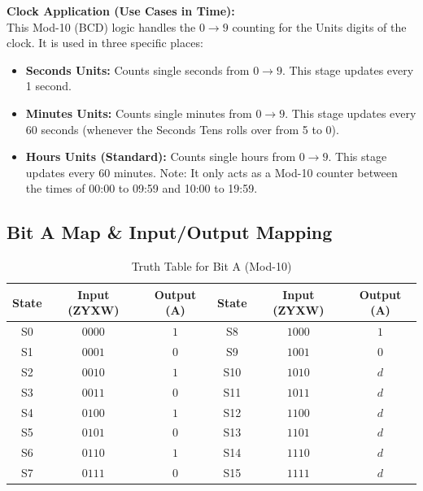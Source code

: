 \documentclass[journal,12pt,onecolumn]{IEEEtran}
\begin{document}
		\begin{justify}
			\textbf{Clock Application (Use Cases in Time):} \\
			This Mod-10 (BCD) logic handles the $0 \rightarrow 9$ counting for the Units digits of the clock. It is used in three specific places:
			\begin{itemize}
				\item \textbf{Seconds Units:} Counts single seconds from $0 \rightarrow 9$. This stage updates every 1 second.
				\item \textbf{Minutes Units:} Counts single minutes from $0 \rightarrow 9$. This stage updates every 60 seconds (whenever the Seconds Tens rolls over from 5 to 0).
				\item \textbf{Hours Units (Standard):} Counts single hours from $0 \rightarrow 9$. This stage updates every 60 minutes. Note: It only acts as a Mod-10 counter between the times of 00:00 to 09:59 and 10:00 to 19:59.
			\end{itemize}
		\end{justify}
		
		\vspace{1em}
		\subsection{Bit A Map \& Input/Output Mapping}
		
		\begin{table}[H]
			\centering
			\begin{tabular}{|c|c|c||c|c|c|}
				\hline
				\textbf{State} & \textbf{Input (ZYXW)} & \textbf{Output (A)} & \textbf{State} & \textbf{Input (ZYXW)} & \textbf{Output (A)} \\
				\hline
				S0 & $0000$ & $1$ & S8 & $1000$ & $1$ \\
				\hline
				S1 & $0001$ & $0$ & S9 & $1001$ & $0$ \\
				\hline
				S2 & $0010$ & $1$ & S10 & $1010$ & $d$ \\
				\hline
				S3 & $0011$ & $0$ & S11 & $1011$ & $d$ \\
				\hline
				S4 & $0100$ & $1$ & S12 & $1100$ & $d$ \\
				\hline
				S5 & $0101$ & $0$ & S13 & $1101$ & $d$ \\
				\hline
				S6 & $0110$ & $1$ & S14 & $1110$ & $d$ \\
				\hline
				S7 & $0111$ & $0$ & S15 & $1111$ & $d$ \\
				\hline
			\end{tabular}
			\caption{Truth Table for Bit A (Mod-10)}
		\end{table}
		
\end{document}
